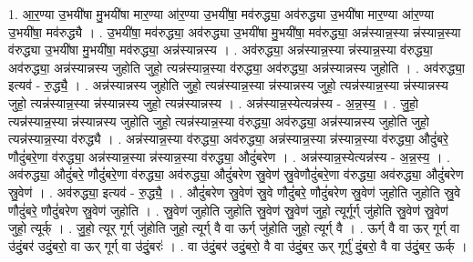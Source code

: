 \documentclass[17pt]{extarticle}
\begin{document}
1. आ॒र॒ण्या उ॒भयी॑षा मु॒भयी॑षा मार॒ण्या आ॑र॒ण्या उ॒भयी॑षा॒ मव॑रुद्ध्या॒ अव॑रुद्ध्या उ॒भयी॑षा मार॒ण्या आ॑र॒ण्या उ॒भयी॑षा॒ मव॑रुद्ध्यै । . उ॒भयी॑षा॒ मव॑रुद्ध्या॒ अव॑रुद्ध्या उ॒भयी॑षा मु॒भयी॑षा॒ मव॑रुद्ध्या॒ अन्न॑स्यान्न॒स्या न्न॑स्यान्न॒स्या व॑रुद्ध्या उ॒भयी॑षा मु॒भयी॑षा॒ मव॑रुद्ध्या॒ अन्न॑स्यान्नस्य । . अव॑रुद्ध्या॒ अन्न॑स्यान्न॒स्या न्न॑स्यान्न॒स्या व॑रुद्ध्या॒ अव॑रुद्ध्या॒ अन्न॑स्यान्नस्य जुहोति जुहो॒ त्यन्न॑स्यान्न॒स्या व॑रुद्ध्या॒ अव॑रुद्ध्या॒ अन्न॑स्यान्नस्य जुहोति । . अव॑रुद्ध्या॒ इत्यव॑ - रु॒द्ध्यै॒ । . अन्न॑स्यान्नस्य जुहोति जुहो॒ त्यन्न॑स्यान्न॒स्या न्न॑स्यान्नस्य जुहो॒ त्यन्न॑स्यान्न॒स्या न्न॑स्यान्नस्य जुहो॒ त्यन्न॑स्यान्न॒स्या न्न॑स्यान्नस्य जुहो॒ त्यन्न॑स्यान्नस्य । . अन्न॑स्यान्न॒स्येत्यन्न॑स्य - अ॒न्न॒स्य॒ । . जु॒हो॒ त्यन्न॑स्यान्न॒स्या न्न॑स्यान्नस्य जुहोति जुहो॒ त्यन्न॑स्यान्न॒स्या व॑रुद्ध्या॒ अव॑रुद्ध्या॒ अन्न॑स्यान्नस्य जुहोति जुहो॒ त्यन्न॑स्यान्न॒स्या व॑रुद्ध्यै । . अन्न॑स्यान्न॒स्या व॑रुद्ध्या॒ अव॑रुद्ध्या॒ अन्न॑स्यान्न॒स्या न्न॑स्यान्न॒स्या व॑रुद्ध्या॒ औदुं॑बरे॒
णौदुं॑बरे॒णा व॑रुद्ध्या॒ अन्न॑स्यान्न॒स्या न्न॑स्यान्न॒स्या व॑रुद्ध्या॒ औदुं॑बरेण । . अन्न॑स्यान्न॒स्येत्यन्न॑स्य - अ॒न्न॒स्य॒ । . अव॑रुद्ध्या॒ औदुं॑बरे॒ णौदुं॑बरे॒णा व॑रुद्ध्या॒ अव॑रुद्ध्या॒ औदुं॑बरेण स्रु॒वेण॑ स्रु॒वेणौदुं॑बरे॒णा व॑रुद्ध्या॒ अव॑रुद्ध्या॒ औदुं॑बरेण स्रु॒वेण॑ । . अव॑रुद्ध्या॒ इत्यव॑ - रु॒द्ध्यै॒ । . औदुं॑बरेण स्रु॒वेण॑ स्रु॒वे णौदुं॑बरे॒ णौदुं॑बरेण स्रु॒वेण॑ जुहोति जुहोति स्रु॒वे णौदुं॑बरे॒
णौदुं॑बरेण स्रु॒वेण॑ जुहोति । . स्रु॒वेण॑ जुहोति जुहोति स्रु॒वेण॑ स्रु॒वेण॑ जुहो॒ त्यूर्गूर्ग् जु॑होति स्रु॒वेण॑ स्रु॒वेण॑ जुहो॒ त्यूर्क् । . जु॒हो॒ त्यूर् गूर्ग् जु॑होति जुहो॒ त्यूर्ग् वै वा ऊर्ग् जु॑होति जुहो॒ त्यूर्ग् वै । . ऊर्ग् वै वा ऊर् गूर्ग् वा उ॑दुं॒बर॑ उदुं॒बरो॒ वा ऊर् गूर्ग् वा उ॑दुं॒बरः॑ । . वा उ॑दुं॒बर॑ उदुं॒बरो॒ वै वा उ॑दुं॒बर॒ ऊर् गूर्गु॑ दुं॒बरो॒ वै वा उ॑दुं॒बर॒ ऊर्क् । \newline
\end{document}
